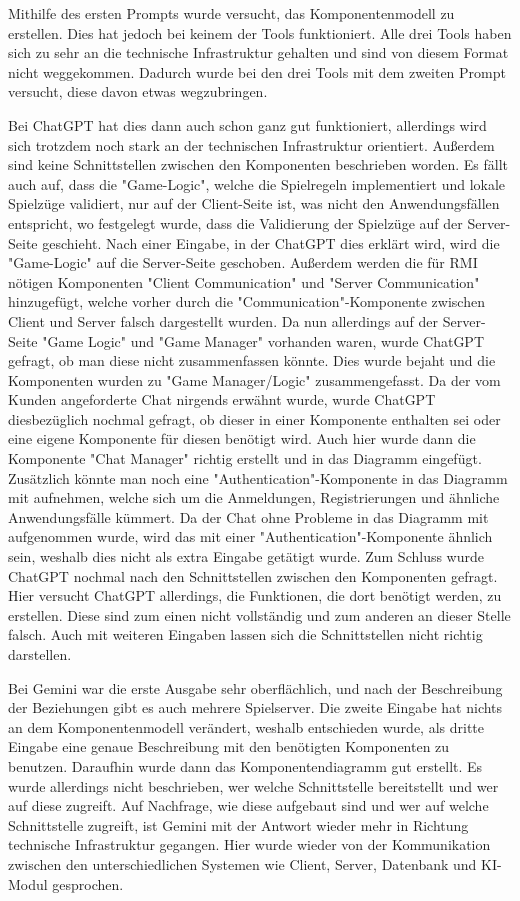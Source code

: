 Mithilfe des ersten Prompts wurde versucht, das Komponentenmodell zu erstellen. Dies hat jedoch bei keinem der Tools funktioniert. Alle drei Tools 
haben sich zu sehr an die technische Infrastruktur gehalten und sind von diesem Format nicht weggekommen. Dadurch wurde bei den drei Tools mit dem 
zweiten Prompt versucht, diese davon etwas wegzubringen.

Bei ChatGPT hat dies dann auch schon ganz gut funktioniert, allerdings wird sich trotzdem noch stark an der technischen Infrastruktur orientiert. 
Außerdem sind keine Schnittstellen zwischen den Komponenten beschrieben worden. Es fällt auch auf, dass die "Game-Logic", welche die Spielregeln 
implementiert und lokale Spielzüge validiert, nur auf der Client-Seite ist, was nicht den Anwendungsfällen entspricht, wo festgelegt wurde, dass 
die Validierung der Spielzüge auf der Server-Seite geschieht. Nach einer Eingabe, in der ChatGPT dies erklärt wird, wird die "Game-Logic" auf die 
Server-Seite geschoben. Außerdem werden die für RMI nötigen Komponenten "Client Communication" und "Server Communication" hinzugefügt, welche 
vorher durch die "Communication"-Komponente zwischen Client und Server falsch dargestellt wurden. Da nun allerdings auf der Server-Seite "Game Logic" 
und "Game Manager" vorhanden waren, wurde ChatGPT gefragt, ob man diese nicht zusammenfassen könnte. Dies wurde bejaht und die Komponenten wurden 
zu "Game Manager/Logic" zusammengefasst. Da der vom Kunden angeforderte Chat nirgends erwähnt wurde, wurde ChatGPT diesbezüglich nochmal gefragt, 
ob dieser in einer Komponente enthalten sei oder eine eigene Komponente für diesen benötigt wird. Auch hier wurde dann die Komponente "Chat Manager" 
richtig erstellt und in das Diagramm eingefügt. Zusätzlich könnte man noch eine "Authentication"-Komponente in das Diagramm mit aufnehmen, welche 
sich um die Anmeldungen, Registrierungen und ähnliche Anwendungsfälle kümmert. Da der Chat ohne Probleme in das Diagramm mit aufgenommen 
wurde, wird das mit einer "Authentication"-Komponente ähnlich sein, weshalb dies nicht als extra Eingabe getätigt wurde. Zum Schluss 
wurde ChatGPT nochmal nach den Schnittstellen zwischen den Komponenten gefragt. Hier versucht ChatGPT allerdings, die Funktionen, die 
dort benötigt werden, zu erstellen. Diese sind zum einen nicht vollständig und zum anderen an dieser Stelle falsch. Auch mit weiteren 
Eingaben lassen sich die Schnittstellen nicht richtig darstellen.

Bei Gemini war die erste Ausgabe sehr oberflächlich, und nach der Beschreibung der Beziehungen gibt es auch mehrere Spielserver. Die 
zweite Eingabe hat nichts an dem Komponentenmodell verändert, weshalb entschieden wurde, als dritte Eingabe eine genaue Beschreibung 
mit den benötigten Komponenten zu benutzen. Daraufhin wurde dann das Komponentendiagramm gut erstellt. Es wurde allerdings nicht 
beschrieben, wer welche Schnittstelle bereitstellt und wer auf diese zugreift. Auf Nachfrage, wie diese aufgebaut sind und wer auf 
welche Schnittstelle zugreift, ist Gemini mit der Antwort wieder mehr in Richtung technische Infrastruktur gegangen. Hier wurde 
wieder von der Kommunikation zwischen den unterschiedlichen Systemen wie Client, Server, Datenbank und KI-Modul gesprochen.

